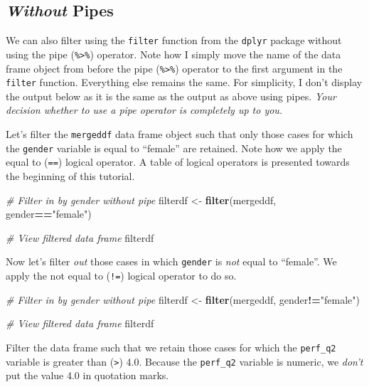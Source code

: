 \documentclass[]{book}
\newenvironment{Shaded}{\begin{snugshade}}{\end{snugshade}}
\newcommand{\KeywordTok}[1]{\textcolor[rgb]{0.13,0.29,0.53}{\textbf{#1}}}
\newcommand{\StringTok}[1]{\textcolor[rgb]{0.31,0.60,0.02}{#1}}
\newcommand{\CommentTok}[1]{\textcolor[rgb]{0.56,0.35,0.01}{\textit{#1}}}
\newcommand{\OperatorTok}[1]{\textcolor[rgb]{0.81,0.36,0.00}{\textbf{#1}}}
\newcommand{\NormalTok}[1]{#1}
\begin{document}
\subsection{\texorpdfstring{\emph{Without}
Pipes}{Without Pipes}}\label{without-pipes}

We can also filter using the \texttt{filter} function from the
\texttt{dplyr} package without using the pipe
(\texttt{\%\textgreater{}\%}) operator. Note how I simply move the name
of the data frame object from before the pipe
(\texttt{\%\textgreater{}\%}) operator to the first argument in the
\texttt{filter} function. Everything else remains the same. For
simplicity, I don't display the output below as it is the same as the
output as above using pipes. \emph{Your decision whether to use a pipe
operator is completely up to you.}

Let's filter the \texttt{mergeddf} data frame object such that only
those cases for which the \texttt{gender} variable is equal to
``female'' are retained. Note how we apply the equal to (\texttt{==})
logical operator. A table of logical operators is presented towards the
beginning of this tutorial.

\begin{Shaded}
\begin{Highlighting}[]
\CommentTok{# Filter in by gender without pipe}
\NormalTok{filterdf <-}\StringTok{ }\KeywordTok{filter}\NormalTok{(mergeddf, gender}\OperatorTok{==}\StringTok{"female"}\NormalTok{)}

\CommentTok{# View filtered data frame}
\NormalTok{filterdf}
\end{Highlighting}
\end{Shaded}

Now let's filter \emph{out} those cases in which \texttt{gender} is
\emph{not} equal to ``female''. We apply the not equal to (\texttt{!=})
logical operator to do so.

\begin{Shaded}
\begin{Highlighting}[]
\CommentTok{# Filter in by gender without pipe}
\NormalTok{filterdf <-}\StringTok{ }\KeywordTok{filter}\NormalTok{(mergeddf, gender}\OperatorTok{!=}\StringTok{"female"}\NormalTok{)}

\CommentTok{# View filtered data frame}
\NormalTok{filterdf}
\end{Highlighting}
\end{Shaded}

Filter the data frame such that we retain those cases for which the
\texttt{perf\_q2} variable is greater than (\texttt{\textgreater{}})
4.0. Because the \texttt{perf\_q2} variable is numeric, we \emph{don't}
put the value 4.0 in quotation marks.
\end{document}
